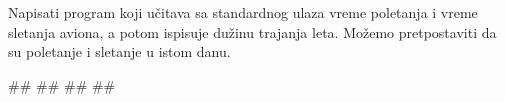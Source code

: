 \begin{Exercise}[label=p1_11] 
Napisati program koji učitava sa standardnog ulaza vreme poletanja i vreme sletanja aviona, a potom ispisuje dužinu trajanja leta. Možemo pretpostaviti da su poletanje i sletanje u istom danu.\\
\begin{miditest}
\begin{upotreba}{1}
#\naslovInt#
##
##
##
\end{upotreba}
\end{miditest}
\end{Exercise}
\begin{Answer}[ref=p1_11]
\end{Answer}

